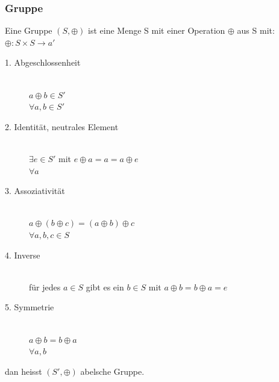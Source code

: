 \documentclass[a4paper,10pt]{article}
\newcommand{\ra}{\rightarrow}
\begin{document}
\subsubsection{Gruppe}
Eine Gruppe $(S,\oplus)$ ist eine Menge S mit einer Operation $\oplus$ aus S mit: $\oplus:S \times S \ra a'$
\begin{description}
	\item[1. Abgeschlossenheit] \hfill \\
		$a \oplus b \in S'$ \\ $\forall a,b \in S'$
	\item[2. Identit\"at, neutrales Element] \hfill \\
		$\exists e \in S' $ mit $e \oplus a=a=a\oplus e$ \\ $ \forall a$
	\item[3. Assoziativit\"at] \hfill \\
		$a \oplus (b \oplus c) = (a \oplus b) \oplus c$ \\ $\forall a,b,c \in S$
	\item[4. Inverse] \hfill \\
		f\"ur jedes $a \in S$ gibt es ein $b \in S$ mit $a \oplus b = b \oplus a = e$
	\item[5. Symmetrie] \hfill \\
		$a \oplus b = b \oplus a$ \\ $\forall a,b$
\end{description}
dan heisst $(S', \oplus)$ abelsche Gruppe.
\end{document}
